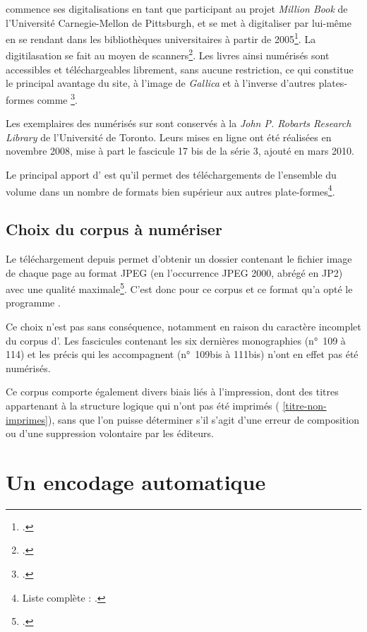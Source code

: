 \ia{} commence ses digitalisations en tant que participant au projet \textit{Million Book} de l'Université Carnegie-Mellon de Pittsburgh, et se met à digitaliser par lui-même en se rendant dans les bibliothèques universitaires à partir de 2005\footcite[p. 4]{Brewster2}. La digitilasation se fait au moyen de scanners\footcite[p. 4]{Brewster2}. Les livres ainsi numérisés sont accessibles  et téléchargeables librement, sans aucune restriction, ce qui constitue le principal avantage du site, à l'image de \textit{Gallica} et à l'inverse d'autres plates-formes comme \gb\footcite[p. 1]{Brewster2}.

Les exemplaires des \odm{} numérisés sur \ia{} sont conservés à la \textit{John P. Robarts Research Library} de l'Université de Toronto. Leurs mises en ligne ont été réalisées en novembre 2008, mise à part le fascicule 17 bis de la série 3, ajouté en mars 2010.

Le principal apport d'\ia{} est qu'il permet des téléchargements de l'ensemble du volume dans un nombre de formats bien supérieur aux autres plate-formes\footnote{Liste complète : \cite[p. 33]{chague}.}.

\section{Choix du corpus à numériser}

Le téléchargement depuis \ia{} permet d'obtenir un dossier contenant le fichier image de chaque page au format JPEG (en l'occurrence JPEG 2000, abrégé en JP2) avec une qualité maximale\footcite{chague2}. C'est donc pour ce corpus et ce format qu'a opté le programme \timeus.

Ce choix n'est pas sans conséquence, notamment en raison du caractère incomplet du corpus d'\ia{}. Les fascicules contenant les six dernières monographies (n°~109 à 114) et les précis qui les accompagnent (n°~109bis à 111bis) n'ont en effet pas été numérisés.

Ce corpus comporte également divers biais liés à l'impression, dont des titres appartenant à la structure logique qui n'ont pas été imprimés (\ann{} \ref{titre-non-imprimes}), sans que l'on puisse déterminer s'il s'agit d'une erreur de composition ou d'une suppression volontaire par les éditeurs.

\chapter{Un encodage automatique}

